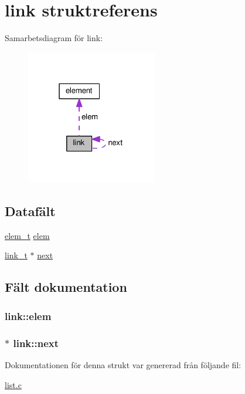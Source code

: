\hypertarget{structlink}{}\section{link struktreferens}
\label{structlink}


Samarbetsdiagram för link\+:\nopagebreak
\begin{figure}[H]
\begin{center}
\leavevmode
\includegraphics[width=162pt]{structlink__coll__graph}
\end{center}
\end{figure}
\subsection*{Datafält}
\begin{DoxyCompactItemize}
\item 
\hyperlink{common_8h_a7fdd31df4fac71b8c34af47c7d45226a}{elem\+\_\+t} \hyperlink{structlink_a83c7f47df8ba3635bf45c0b8debffde5}{elem}
\item 
\hyperlink{list_8c_ab1a5f2fcda4f00dce92c82ebc30c4b3d}{link\+\_\+t} $\ast$ \hyperlink{structlink_a5e51af3becfae77d89502036a8e508c2}{next}
\end{DoxyCompactItemize}


\subsection{Fält dokumentation}
\subsubsection[{\texorpdfstring{elem}{elem}}]{ link\+::elem}\hypertarget{structlink_a83c7f47df8ba3635bf45c0b8debffde5}{}\label{structlink_a83c7f47df8ba3635bf45c0b8debffde5}
\subsubsection[{\texorpdfstring{next}{next}}]{$\ast$ link\+::next}\hypertarget{structlink_a5e51af3becfae77d89502036a8e508c2}{}\label{structlink_a5e51af3becfae77d89502036a8e508c2}


Dokumentationen för denna strukt var genererad från följande fil\+:\begin{DoxyCompactItemize}
\item 
\hyperlink{list_8c}{list.\+c}\end{DoxyCompactItemize}
